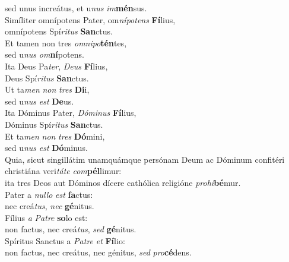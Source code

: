 \evenverse sed unus increátus, et u\textit{nus} \textit{im}\textbf{mén}sus.\\
\oddverse Simíliter omnípotens Pater, om\textit{ní}\textit{po}\textit{tens} \textbf{Fí}lius,~\*\\
\oddverse omnípotens Spí\textit{ri}\textit{tus} \textbf{San}ctus.\\
\evenverse Et tamen non tres \textit{om}\textit{ni}\textit{po}\textbf{tén}tes,~\*\\
\evenverse sed u\textit{nus} \textit{om}\textbf{ní}potens.\\
\oddverse Ita Deus Pa\textit{ter}, \textit{De}\textit{us} \textbf{Fí}lius,~\*\\
\oddverse Deus Spí\textit{ri}\textit{tus} \textbf{San}ctus.\\
\evenverse Ut ta\textit{men} \textit{non} \textit{tres} \textbf{Di}i,~\*\\
\evenverse sed u\textit{nus} \textit{est} \textbf{De}us.\\
\oddverse Ita Dóminus Pater, \textit{Dó}\textit{mi}\textit{nus} \textbf{Fí}lius,~\*\\
\oddverse Dóminus Spí\textit{ri}\textit{tus} \textbf{San}ctus.\\
\evenverse Et ta\textit{men} \textit{non} \textit{tres} \textbf{Dó}mini,~\*\\
\evenverse sed u\textit{nus} \textit{est} \textbf{Dó}minus.\\
\oddverse Quia, sicut singillátim unamquámque persónam Deum ac Dóminum confitéri christiána veri\textit{tá}\textit{te} \textit{com}\textbf{pél}limur:~\*\\
\oddverse ita tres Deos aut Dóminos dícere cathólica religióne \textit{pro}\textit{hi}\textbf{bé}mur.\\
\evenverse Pater a \textit{nul}\textit{lo} \textit{est} \textbf{fa}ctus:~\*\\
\evenverse nec creá\textit{tus}, \textit{nec} \textbf{gé}nitus.\\
\oddverse Fílius \textit{a} \textit{Pa}\textit{tre} \textbf{so}lo est:~\*\\
\oddverse non factus, nec creá\textit{tus}, \textit{sed} \textbf{gé}nitus.\\
\evenverse Spíritus Sanctus a \textit{Pa}\textit{tre} \textit{et} \textbf{Fí}lio:~\*\\
\evenverse non factus, nec creátus, nec génitus, \textit{sed} \textit{pro}\textbf{cé}dens.\\
